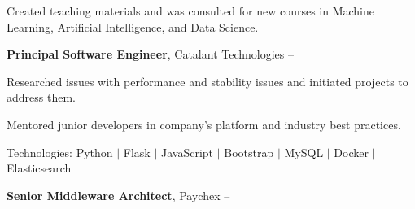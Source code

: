 \documentclass[MMMMyyyy,nonstopmode]{simpleresumecv_stacked}
\newcommand{\tech}[1]{\Gap\textrm{Technologies:} #1}
\newif\ifLOCATION
\begin{document}
\begin{Body}
\iffalse %

\Entry
\textbf{Consultant - Logical Operations} \textit{(Part-Time)}
\hfill
Occasionally since \DatestampY{2020}

\ifLOCATION
\hfill 
Rochester, New York
\fi

\begin{Detail}
\BulletItem
Created teaching materials and was consulted for new courses in Machine Learning, Artificial Intelligence, and Data Science.
\end{Detail}
\fi %

\BigGap

\Entry
\textbf{Principal Software Engineer}, Catalant Technologies
\hfill
 -- 

\ifLOCATION
\hfill
Rochester, New York
\fi

\Gap

\begin{Detail}

\BulletItem
Researched issues with performance and stability issues and initiated projects to address them.

\BulletItem
Mentored junior developers in company's platform and industry best practices.

\tech{Python $|$ Flask $|$ JavaScript $|$ Bootstrap $|$ MySQL $|$ Docker $|$ Elasticsearch}

\end{Detail}

\BigGap


\Entry
\textbf{Senior Middleware Architect}, Paychex
\hfill
{} -- 


\end{Body}
\end{document}
